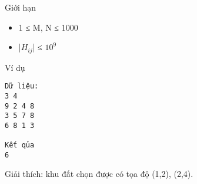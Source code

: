 Giới hạn
\begin{itemize}
	\item 1 ≤ M, N ≤ 1000
	\item |$H_{ij}$| ≤ $10^{9}$
\end{itemize}
Ví dụ
\begin{verbatim}
Dữ liệu:
3 4
9 2 4 8
3 5 7 8
6 8 1 3

Kết qủa
6
\end{verbatim}

Giải thích: khu đất chọn được có tọa độ (1,2), (2,4).